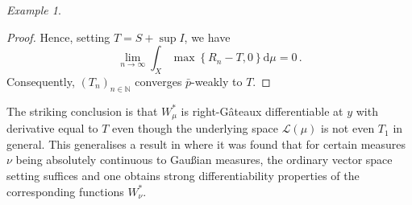 \documentclass[
	paper=A4,
	pagesize=auto,
	fontsize=12pt
]{scrartcl}
\theoremstyle{plain}
\theoremstyle{remark}
\newtheorem{example}[theorem]{Example}
\theoremstyle{definition}
\begin{document}
\begin{example}
\begin{proof}
Hence, setting $T = S + \sup I$, we have
%
\begin{equation}
\lim_{n \to \infty} \int_X \max \left\{ R_n - T, 0 \right\} \mathrm{d} \mu
=
0 \, .
\end{equation}
%
Consequently, $(T_n)_{n \in \mathbb{N}}$ converges $\bar{p}$-weakly to $T$.
\end{proof}
%
The striking conclusion is that $W_\mu^*$ is right-Gâteaux differentiable at $y$ with derivative equal to $T$ even though the underlying space $\mathcal{L}(\mu)$ is not even $T_1$ in general.
This generalises a result in \cite{src:Ziebell:RigorousFRG} where it was found that for certain measures $\nu$ being absolutely continuous to Gaußian measures, the ordinary vector space setting suffices and one obtains strong differentiability properties of the corresponding functions $W_\nu^*$.
\end{example}
%
\printbibliography
\end{document}
